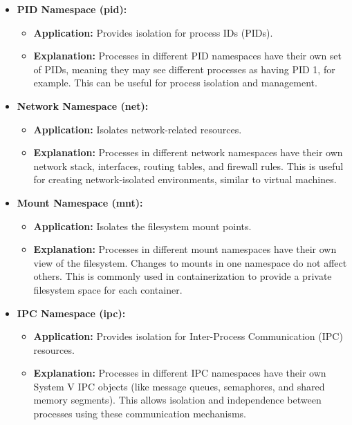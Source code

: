 \documentclass{report}
\begin{document}
\begin{itemize}

  \item \textbf{PID Namespace (pid):}
    \begin{itemize}
      \item \textbf{Application:} Provides isolation for process IDs (PIDs).
      \item \textbf{Explanation:} Processes in different PID namespaces have their own set of PIDs, meaning they may see different processes as having PID 1, for example. This can be useful for process isolation and management.
    \end{itemize}

  \item \textbf{Network Namespace (net):}
    \begin{itemize}
      \item \textbf{Application:} Isolates network-related resources.
      \item \textbf{Explanation:} Processes in different network namespaces have their own network stack, interfaces, routing tables, and firewall rules. This is useful for creating network-isolated environments, similar to virtual machines.
    \end{itemize}

  \item \textbf{Mount Namespace (mnt):}
    \begin{itemize}
      \item \textbf{Application:} Isolates the filesystem mount points.
      \item \textbf{Explanation:} Processes in different mount namespaces have their own view of the filesystem. Changes to mounts in one namespace do not affect others. This is commonly used in containerization to provide a private filesystem space for each container.
    \end{itemize}

  \item \textbf{IPC Namespace (ipc):}
    \begin{itemize}
      \item \textbf{Application:} Provides isolation for Inter-Process Communication (IPC) resources.
      \item \textbf{Explanation:} Processes in different IPC namespaces have their own System V IPC objects (like message queues, semaphores, and shared memory segments). This allows isolation and independence between processes using these communication mechanisms.
    \end{itemize}


\end{itemize}
\end{document}
